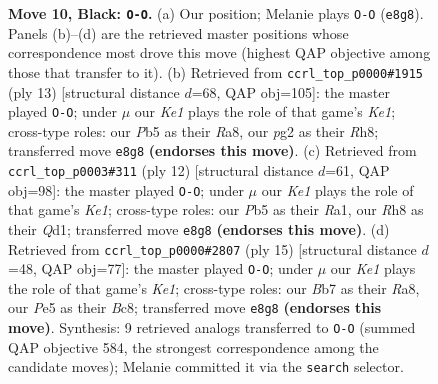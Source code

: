 \documentclass[11pt]{article}
\begin{document}
\begin{figure}[p]
\caption{\textbf{Move 10, Black: \texttt{O-O}.} (a) Our position; Melanie plays \texttt{O-O} (\texttt{e8g8}). Panels (b)--(d) are the retrieved master positions whose correspondence most drove this move (highest QAP objective among those that transfer to it). (b) Retrieved from \texttt{ccrl\_top\_p0000\#1915} (ply 13) [structural distance $d$=68, QAP obj=105]: the master played \texttt{O-O}; under $\mu$ our \emph{Ke1} plays the role of that game's \emph{Ke1}; cross-type roles: our \emph{P}b5 as their \emph{R}a8, our \emph{p}g2 as their \emph{R}h8; transferred move \texttt{e8g8} \textbf{(endorses this move)}. (c) Retrieved from \texttt{ccrl\_top\_p0003\#311} (ply 12) [structural distance $d$=61, QAP obj=98]: the master played \texttt{O-O}; under $\mu$ our \emph{Ke1} plays the role of that game's \emph{Ke1}; cross-type roles: our \emph{P}b5 as their \emph{R}a1, our \emph{R}h8 as their \emph{Q}d1; transferred move \texttt{e8g8} \textbf{(endorses this move)}. (d) Retrieved from \texttt{ccrl\_top\_p0000\#2807} (ply 15) [structural distance $d$=48, QAP obj=77]: the master played \texttt{O-O}; under $\mu$ our \emph{Ke1} plays the role of that game's \emph{Ke1}; cross-type roles: our \emph{B}b7 as their \emph{R}a8, our \emph{P}e5 as their \emph{B}c8; transferred move \texttt{e8g8} \textbf{(endorses this move)}. Synthesis: 9 retrieved analogs transferred to \texttt{O-O} (summed QAP objective 584, the strongest correspondence among the candidate moves); Melanie committed it via the \texttt{search} selector.}
\label{fig:thought-m19}
\end{figure}

\clearpage
\end{document}
